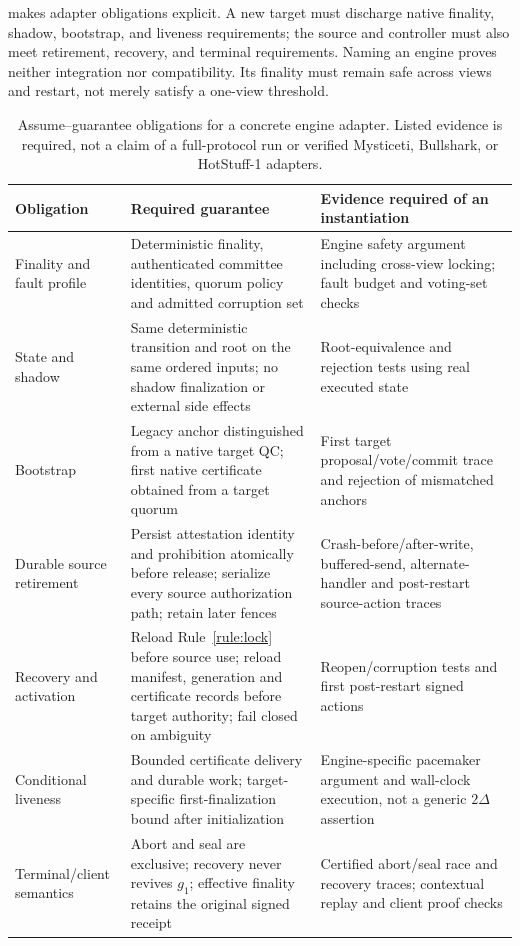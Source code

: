  makes adapter obligations explicit. A new target must discharge native
finality, shadow, bootstrap, and liveness requirements; the source and controller must also meet
retirement, recovery, and terminal requirements. Naming an engine proves neither integration
nor compatibility. Its finality must remain safe across views and restart, not merely satisfy
a one-view threshold.

\begin{table}[t]
\centering
\caption{Assume--guarantee obligations for a concrete engine adapter. Listed evidence is required,
not a claim of a full-protocol run or verified Mysticeti, Bullshark, or HotStuff-1 adapters.}
\label{tab:adapter}
\small
\renewcommand{\arraystretch}{1.12}
\begin{tabularx}{\textwidth}{@{}L{0.18\textwidth}YL{0.28\textwidth}@{}}
\toprule
\textbf{Obligation} & \textbf{Required guarantee} & \textbf{Evidence required of an instantiation} \\
\midrule
Finality and fault profile & Deterministic finality, authenticated committee identities, quorum policy and admitted corruption set & Engine safety argument including cross-view locking; fault budget and voting-set checks \\
State and shadow & Same deterministic transition and root on the same ordered inputs; no shadow finalization or external side effects & Root-equivalence and rejection tests using real executed state \\
Bootstrap & Legacy anchor distinguished from a native target QC; first native certificate obtained from a target quorum & First target proposal/vote/commit trace and rejection of mismatched anchors \\
Durable source retirement & Persist attestation identity and prohibition atomically before release; serialize every source authorization path; retain later fences & Crash-before/after-write, buffered-send, alternate-handler and post-restart source-action traces \\
Recovery and activation & Reload Rule~\ref{rule:lock} before source use; reload manifest, generation and certificate records before target authority; fail closed on ambiguity & Reopen/corruption tests and first post-restart signed actions \\
Conditional liveness & Bounded certificate delivery and durable work; target-specific first-finalization bound after initialization & Engine-specific pacemaker argument and wall-clock execution, not a generic $2\Delta$ assertion \\
Terminal/client semantics & Abort and seal are exclusive; recovery never revives $g_1$; effective finality retains the original signed receipt & Certified abort/seal race and recovery traces; contextual replay and client proof checks \\
\bottomrule
\end{tabularx}
\end{table}

